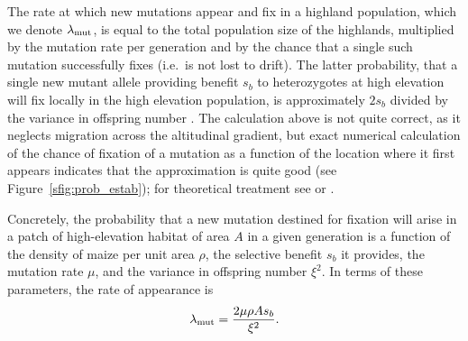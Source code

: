 The rate at which new mutations appear and fix in a highland population, which we denote $\lambda_{\text{mut}}$,
is equal to the total population size of the highlands, multiplied by the mutation rate per generation
and by the chance that a single such mutation successfully fixes
(i.e.\ is not lost to drift).
The latter probability, that a single new mutant allele providing benefit $s_b$ to heterozygotes at high elevation
will fix locally in the high elevation population,
is approximately $2s_b$ divided by the variance in offspring number \citep{jagers1975branching}.
The calculation above is not quite correct, as it neglects migration across the altitudinal gradient,
but exact numerical calculation of the chance of fixation of a mutation as a function of the location where it first appears
indicates that the approximation is quite good (see Figure~\ref{sfig:prob_estab});
for theoretical treatment see \citet{pollak1966survival} or \citet{barton1987establishment}.


Concretely, the probability that a new mutation destined for fixation
will arise in a patch of high-elevation habitat of area $A$ in a given generation
is a function of the density of maize per unit area $\rho$,
the selective benefit $s_b$ it provides,
the mutation rate $\mu$,
and the variance in offspring number $\xi^2$.
In terms of these parameters, the rate of appearance is
\begin{align} \label{eqn:mutrate}
  \lambda_{\text{mut}} = \frac{2 \mu \rho A s_b}{\xi^2} .
\end{align}

